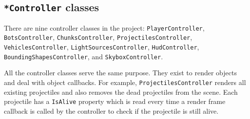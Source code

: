 \subsection{\texttt{*Controller} classes}
There are nine controller classes in the project:
\texttt{PlayerController},
\texttt{BotsController},
\texttt{ChunksController},
\texttt{ProjectilesController},
\texttt{VehiclesController},
\texttt{LightSourcesController},
\texttt{HudController},
\texttt{BoundingShapesController}, and
\texttt{SkyboxController}.

All the controller classes serve the same purpose.
They exist to render objects and deal with object callbacks.
For example, \texttt{ProjectilesController} renders all existing projectiles and also removes the dead projectiles from the scene.
Each projectile has a \texttt{IsAlive} property which is read every time a render frame callback is called by the controller to check if the projectile is still alive.
